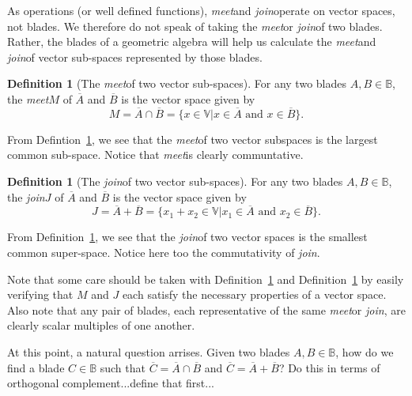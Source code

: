 \documentclass{birkjour}
\theoremstyle{definition}
\newtheorem{defn}[thm]{Definition}
\theoremstyle{remark}
\numberwithin{equation}{section}
\newcommand{\B}{\mathbb{B}}
\newcommand{\V}{\mathbb{V}}
\newcommand{\meet}{{\it meet}\;}
\newcommand{\join}{{\it join}\;}
\newcommand{\vecspace}{\overline}
\begin{document}
As operations (or well defined functions), \meet and \join operate on vector spaces, not blades.
We therefore do not speak of taking the \meet or \join of two blades.  Rather, the blades of a geometric
algebra will help us calculate the \meet and \join of vector sub-spaces represented by those blades.

\begin{defn}[The \meet of two vector sub-spaces]\label{def_meet}
For any two blades $A,B\in\B$, the \meet $M$ of $\vecspace{A}$ and $\vecspace{B}$ is the
vector space given by
\begin{equation}
M = \vecspace{A}\cap \vecspace{B} = \{x\in\V|\mbox{$x\in \vecspace{A}$ and $x\in \vecspace{B}$}\}.
\end{equation}
\end{defn}
From Defintion~\ref{def_meet}, we see that the \meet of two vector subspaces
is the largest common sub-space.  Notice that \meet is clearly communtative.

\begin{defn}[The \join of two vector sub-spaces]\label{def_join}
For any two blades $A,B\in\B$, the \join $J$ of $\vecspace{A}$ and $\vecspace{B}$ is the
vector space given by
\begin{equation}
J = \vecspace{A}+\vecspace{B} = \{x_1+x_2\in\V|\mbox{$x_1\in \vecspace{A}$ and $x_2\in \vecspace{B}$}\}.
\end{equation}
\end{defn}
From Definition~\ref{def_join}, we see that the \join of two vector spaces
is the smallest common super-space.  Notice here too the commutativity of \join.

Note that some care should be taken with Definition~\ref{def_meet} and
Definition~\ref{def_join} by easily verifying that $M$ and $J$ each satisfy the
necessary properties of a vector space.
Also note that any pair of blades, each representative of the same \meet or \join, are clearly
scalar multiples of one another.

At this point, a natural question arrises.  Given two blades $A,B\in\B$, how do we find a blade
$C\in\B$ such that $\vecspace{C}=\vecspace{A}\cap\vecspace{B}$ and $\vecspace{C}=\vecspace{A}+\vecspace{B}$?
Do this in terms of orthogonal complement...define that first...

\end{document}
